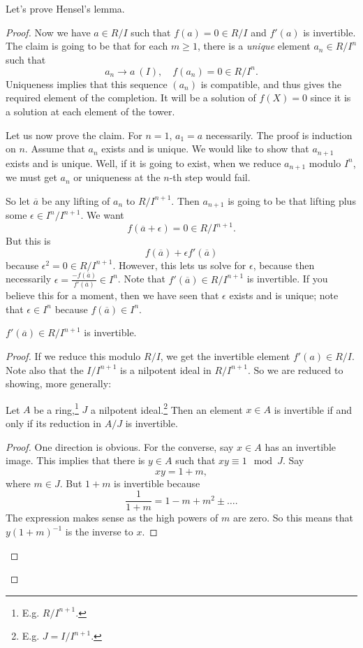 Let's prove Hensel's lemma.
\begin{proof} 
Now we have $a \in R/I$ such that $f(a) = 0 \in R/I$ and $f'(a)$ is invertible. 
The claim is going to be that for each $m \geq 1$, there is a \emph{unique}
element $a_n \in R/I^n$ such that
\[ a_n \to a \ (I), \quad f(a_n)  = 0 \in R/I^n.  \]
Uniqueness implies that this sequence $(a_n)$ is compatible, and thus gives the
required element of the completion.
It will be a solution of $f(X) = 0$ since it is a solution at each element of
the tower.

Let us now prove the claim.
For $n=1$, $a_1 = a$ necessarily. 
The proof is induction on $n$. Assume that $a_n$ exists and is unique. We would like to show
that $a_{n+1}$ exists and is unique. Well, if it is going to exist, when we
reduce $a_{n+1}$ modulo $I^n$, we must get $a_n$ or uniqueness at the $n$-th
step would fail. 

So let $\overline{a}$ be any lifting of $a_n$ to $R/I^{n+1}$.  Then $a_{n+1}$
is going to be that lifting plus some $\epsilon \in I^n/I^{n+1}$. We want
\[ f(\overline{a} + \epsilon) = 0 \in R/I^{n+1}.  \]
But this is 
\[ f(\overline{a}) +  \epsilon f'(\overline{a})  \]
because $\epsilon^2 = 0 \in R/I^{n+1}$. However, this lets us solve for
$\epsilon$, because then necessarily $\epsilon =
\frac{-f(\overline{a})}{f'(\overline{a})} \in I^n$.
Note that $f'(\overline{a}) \in R/I^{n+1}$ is invertible. If you believe this
for a moment, then we have seen that $\epsilon$ exists and is unique; note
that $\epsilon \in I^n$ because $f(\overline{a}) \in I^n$. 


\begin{lemma} 
$f'(\overline{a}) \in R/I^{n+1}$ is invertible.
\end{lemma} 
\begin{proof} 
If we reduce this modulo $R/I$, we get the invertible element $f'(a) \in R/I$.
Note also that the $I/I^{n+1}$ is a nilpotent ideal in $R/I^{n+1}$. So we are
reduced to showing, more generally:

\begin{lemma} 
Let $A$ be a ring,\footnote{E.g. $R/I^{n+1}$.} $J$ a nilpotent
ideal.\footnote{E.g. $J = I/I^{n+1}$.} Then an element $x \in A$ is invertible
if and only if its reduction in $A/J$ is invertible.
\end{lemma} 
\begin{proof} 
One direction is obvious. For the converse, say $x \in A$  has an invertible
image. This implies that there is $y \in A$ such that $xy \equiv 1 \mod J$. Say
$$xy = 1+m,$$ where $m \in J$. But $1+m$ is invertible because 
\[ \frac{1}{1+m} = 1 - m + m^2 \pm \dots.  \]
The expression makes sense as the high powers of $m$ are zero. 
So this means that $y(1+m)^{-1}$ is the inverse to $x$. 
\end{proof} 
\end{proof} 
\end{proof} 

